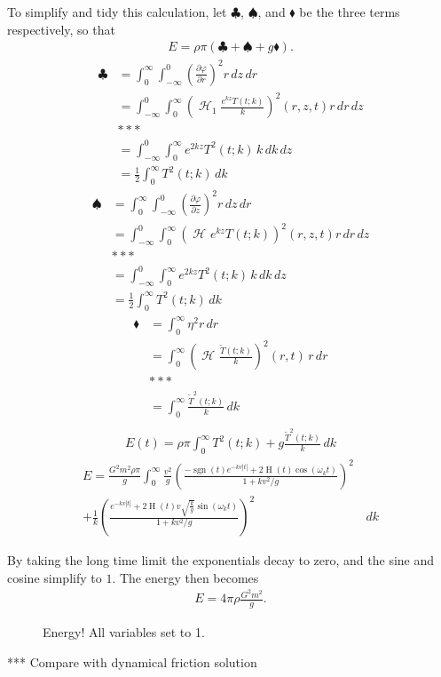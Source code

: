 \documentclass[12pt]{article}
\DeclareMathOperator{\sgn}{sgn}
\DeclareMathOperator{\Heavi}{H}
\DeclareMathOperator{\Hsign}{\mathscr{H}}
\newcommand\Hank[2][]{{\left( \Hsign_{#1} #2 \right) }}
\begin{document}
To simplify and tidy this calculation, let $\clubsuit$, $\spadesuit$, and $\blacklozenge$ be the three terms respectively, so that
\begin{align*}
E = \rho \pi (\clubsuit + \spadesuit + g \blacklozenge).
\end{align*}
\begin{align*}
\clubsuit &= \int_0^\infty \int_{-\infty}^0 \left( \frac{\partial \varphi}{\partial r} \right)^2 r \, dz \, dr \\
&= \int_{-\infty}^0 \int_0^\infty \Hank[1]{\frac{e^{kz}T(t;k)}{k}}^2(r,z,t) r \, dr \, dz \\
&*** \\
&= \int_{-\infty}^0 \int_0^\infty e^{2kz} T^2(t;k) \, k \, dk \, dz \\
&= \frac{1}{2} \int_0^\infty T^2(t;k) \, dk
\end{align*}
\begin{align*}
\spadesuit &= \int_0^\infty \int_{-\infty}^0 \left( \frac{\partial \varphi}{\partial z} \right)^2 r \, dz \, dr \\
&= \int_{-\infty}^0 \int_0^\infty \Hank{e^{kz}T(t;k)}^2(r,z,t) r \, dr \, dz \\
&*** \\
&= \int_{-\infty}^0 \int_0^\infty e^{2kz} T^2(t;k) \, k \, dk \, dz \\
&= \frac{1}{2} \int_0^\infty T^2(t;k) \, dk
\end{align*}
\begin{align*}
\blacklozenge &=  \int_0^\infty \eta^2 r \, dr \\
&= \int_0^\infty \Hank{\frac{\widetilde{T}(t;k)}{k}}^2(r,t) \, r \, dr \\
&*** \\
&= \int_0^\infty \frac{\widetilde{T}^2(t;k)}{k} \, dk \\
\end{align*}
\begin{align*}
E(t) = \rho \pi \int_0^\infty T^2(t;k) + g \frac{\widetilde{T}^2(t;k)}{k} \, dk
\end{align*}
\begin{equation*}
\begin{split}
E = \frac{G^2 m^2 \rho \pi}{g} \int_0^\infty \frac{v^2}{g} \left( \frac{- \sgn(t) e^{-kv |t|} + 2 \Heavi(t) \cos(\omega_k t)}{1+kv^2/g} \right)^2& \\
+ \frac{1}{k} \left( \frac{e^{-kv |t|} + 2 \Heavi(t) v \sqrt{\frac{k}{g}} \sin(\omega_k t)}{1+kv^2/g} \right)^2& \, dk
\end{split}
\end{equation*}

By taking the long time limit the exponentials decay to zero, and the sine and cosine simplify to $1$. The energy then becomes
\begin{align*}
E = 4 \pi \rho \frac{G^2 m^2}{g}.
\end{align*}


\begin{figure}[p]
 
 \caption{Energy! All variables set to 1.}
 \label{fig:analyticenergy}
\end{figure}

***
Compare with dynamical friction solution
\end{document}
